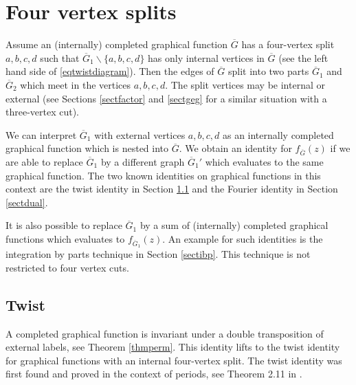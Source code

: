 \documentclass[oneside]{amsart}
\newcommand{\Gg}{{\overline{G}}}
\theoremstyle{plain}
\begin{document}
\section{Four vertex splits}\label{sect4split}
Assume an (internally) completed graphical function $\Gg$ has a four-vertex split $a,b,c,d$ such that $\Gg_1\backslash\{a,b,c,d\}$ has only internal vertices in $\Gg$
(see the left hand side of \eqref{eqtwistdiagram}). Then the edges of $\Gg$ split into two parts $\Gg_1$ and $\Gg_2$ which meet in the vertices $a,b,c,d$.
The split vertices may be internal or external (see Sections \ref{sectfactor} and \ref{sectgeg} for a similar situation with a three-vertex cut).

We can interpret $\Gg_1$ with external vertices $a,b,c,d$ as an internally completed graphical function which
is nested into $\Gg$. We obtain an identity for $f_\Gg(z)$ if we are able to replace $\Gg_1$ by a different graph $\Gg_1'$ which evaluates to the same graphical function.
The two known identities on graphical functions in this context are the twist identity in Section \ref{secttwist} and the Fourier identity in Section \ref{sectdual}.

It is also possible to replace $\Gg_1$ by a sum of (internally) completed graphical functions which evaluates to $f_{\Gg_1}(z)$. An example for such identities is the integration
by parts technique in Section \ref{sectibp}. This technique is not restricted to four vertex cuts.

\subsection{Twist}\label{secttwist}
A completed graphical function is invariant under a double transposition of external labels, see Theorem \ref{thmperm}. This identity lifts to the twist identity for graphical
functions with an internal four-vertex split. The twist identity was first found and proved in the context of periods, see Theorem 2.11 in \cite{Census}.
\end{document}

